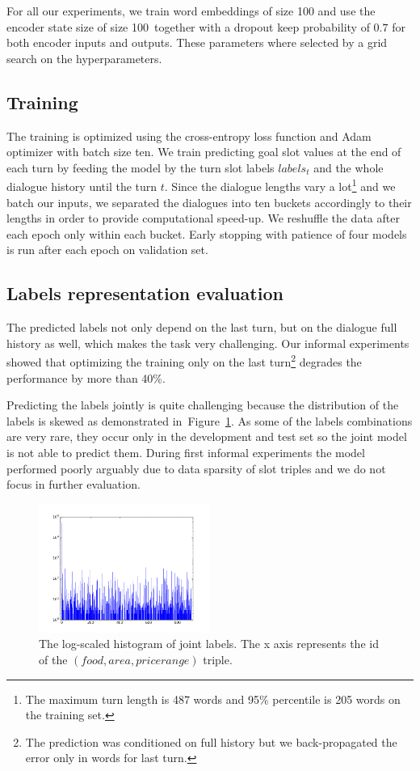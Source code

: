 \documentclass{itatnew}
\begin{document}
For all our experiments, we train word embeddings of size 100 and use the encoder state size of size 100\, together with a dropout keep probability of $0.7$ for both encoder inputs and outputs.
These parameters where selected by a grid search on the hyperparameters.

\subsection{Training}
\label{sec:train}
The training is optimized using the cross-entropy loss function and Adam optimizer\cite{kingma2014adam} with batch size ten.
We train predicting goal slot values at the end of each turn by feeding the model by the turn slot labels $labels_t$ and the whole dialogue history until the turn $t$.
Since the dialogue lengths vary a lot\footnote{The maximum turn length is 487 words and 95\% percentile is 205 words on the training set.} and we batch our inputs, we separated the dialogues into ten buckets accordingly to their lengths in order to provide computational speed-up. We reshuffle the data after each epoch only within each bucket.
Early stopping with patience\cite{prechelt1998early} of four models is run after each epoch on validation set.

\subsection{Labels representation evaluation}
\label{sec:eval}
The predicted labels not only depend on the last turn, but on the dialogue full history as well, which makes the task very challenging.
Our informal experiments showed that optimizing the training only on the last turn\footnote{The prediction was conditioned on full history but we back-propagated the error only in words for last turn.} degrades the performance by more than 40\%.

Predicting the labels jointly is quite challenging because the distribution of the labels is skewed as demonstrated in~Figure~\ref{fig:labels}.
As some of the labels combinations are very rare, they occur only in the development and test set so the joint model is not able to predict them.
During first informal experiments the model performed poorly arguably due to data sparsity of slot triples and we do not focus in further evaluation.

\begin{figure}
\includegraphics[width=0.5\textwidth]{dstc2_goals_joint_log_scale}
\caption{The log-scaled histogram of joint labels. The x axis represents the id of the $(food, area, pricerange)$ triple.}
\label{fig:labels}
\end{figure}
\end{document}

